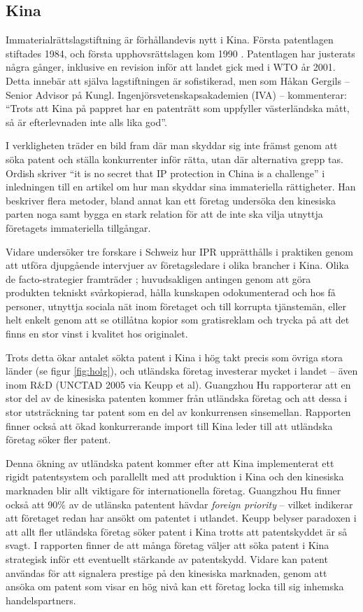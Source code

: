 
\subsection{Kina}

Immaterialrättslagstiftning är förhållandevis nytt i Kina. Första patentlagen stiftades 1984, och första upphovsrättslagen kom 1990 \cite{gergils}. Patentlagen har justerats några gånger, inklusive en revision inför att landet gick med i WTO år 2001. Detta innebär att själva lagstiftningen är sofistikerad, men som Håkan Gergils -- Senior Advisor på Kungl. Ingenjörsvetenskapsakademien (IVA) -- kommenterar: ``Trots att Kina på pappret har en patenträtt som uppfyller västerländska mått, så är 
efterlevnaden inte alls lika god''.

I verkligheten träder en bild fram där man skyddar sig inte främst genom att söka patent och ställa konkurrenter inför rätta, utan där alternativa grepp tas. Ordish skriver ``it is no secret that IP protection in China is a challenge'' \cite{ordish} i inledningen till en artikel om hur man skyddar sina immateriella rättigheter. Han beskriver flera metoder, bland annat kan ett företag undersöka den kinesiska parten noga samt bygga en stark relation för att de inte ska vilja utnyttja företagets immateriella tillgångar.

Vidare undersöker tre forskare i Schweiz hur IPR upprätthålls i praktiken genom att utföra djupgående intervjuer av företagsledare i olika brancher i Kina. Olika de facto-strategier framträder \cite{keupp}; huvudsakligen antingen genom att göra produkten tekniskt svårkopierad, hålla kunskapen odokumenterad och hos få personer, utnyttja sociala nät inom företaget och till korrupta tjänstemän, eller helt enkelt genom att se otillåtna kopior som gratisreklam och trycka på att det finns en stor vinst i kvalitet hos originalet.

Trots detta ökar antalet sökta patent i Kina i hög takt precis som övriga stora länder (se figur \ref{fig:holg}), och utländska företag investerar mycket i landet -- även inom R\&D (UNCTAD 2005 via Keupp et al). Guangzhou Hu rapporterar att en stor del av de kinesiska patenten kommer från utländska företag och att dessa i stor utsträckning tar patent som en del av konkurrensen sinsemellan\cite{hu}. Rapporten finner också att ökad konkurrerande import till Kina leder till att utländska företag söker fler patent.

Denna ökning av utländska patent kommer efter att Kina implementerat ett rigidt patentsystem och parallellt med att produktion i Kina och den kinesiska marknaden blir allt viktigare för internationella företag. Guangzhou Hu finner också att 90\% av de utlänska patentent hävdar \emph{foreign priority} -- vilket indikerar att företaget redan har ansökt om patentet i utlandet\cite{hu}. Keupp belyser paradoxen i att allt fler utländska företag söker patent i Kina trotts att patentskyddet är så svagt\cite{keupp2}. I rapporten finner de att många företag väljer att söka patent i Kina strategisk inför ett eventuellt stärkande av patentskydd\cite{keupp2}. Vidare kan patent användas för att signalera prestige på den kinesiska marknaden, genom att ansöka om patent som visar en hög nivå kan ett företag locka till sig inhemska handelspartners\cite{keupp2}.
